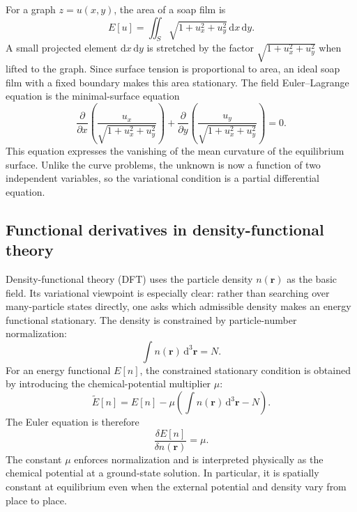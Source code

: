\begin{example}
For a graph $z=u(x,y)$, the area of a soap film is
\begin{equation}
E[u]=\iint_S\sqrt{1+u_x^2+u_y^2}\,\mathrm{d}x\,\mathrm{d}y.
\end{equation}
A small projected element $\mathrm{d}x\,\mathrm{d}y$ is stretched by the factor $\sqrt{1+u_x^2+u_y^2}$ when lifted to the graph. Since surface tension is proportional to area, an ideal soap film with a fixed boundary makes this area stationary. The field Euler--Lagrange equation is the minimal-surface equation
\begin{equation}
\frac{\partial}{\partial x}
\left(\frac{u_x}{\sqrt{1+u_x^2+u_y^2}}\right)
+\frac{\partial}{\partial y}
\left(\frac{u_y}{\sqrt{1+u_x^2+u_y^2}}\right)=0.
\end{equation}
This equation expresses the vanishing of the mean curvature of the equilibrium surface. Unlike the curve problems, the unknown is now a function of two independent variables, so the variational condition is a partial differential equation.
\end{example}

\subsection{Functional derivatives in density-functional theory}
Density-functional theory (DFT) uses the particle density $n(\mathbf{r})$ as the basic field. Its variational viewpoint is especially clear: rather than searching over many-particle states directly, one asks which admissible density makes an energy functional stationary. The density is constrained by particle-number normalization:
\begin{equation}
\int n(\mathbf{r})\,\mathrm{d}^3\mathbf{r}=N.
\end{equation}
For an energy functional $E[n]$, the constrained stationary condition is obtained by introducing the chemical-potential multiplier $\mu$:
\begin{equation}
\widetilde E[n]=E[n]-\mu\left(\int n(\mathbf{r})\,\mathrm{d}^3\mathbf{r}-N\right).
\end{equation}
The Euler equation is therefore
\begin{equation}
\frac{\delta E[n]}{\delta n(\mathbf{r})}=\mu.
\end{equation}
The constant $\mu$ enforces normalization and is interpreted physically as the chemical potential at a ground-state solution. In particular, it is spatially constant at equilibrium even when the external potential and density vary from place to place.

